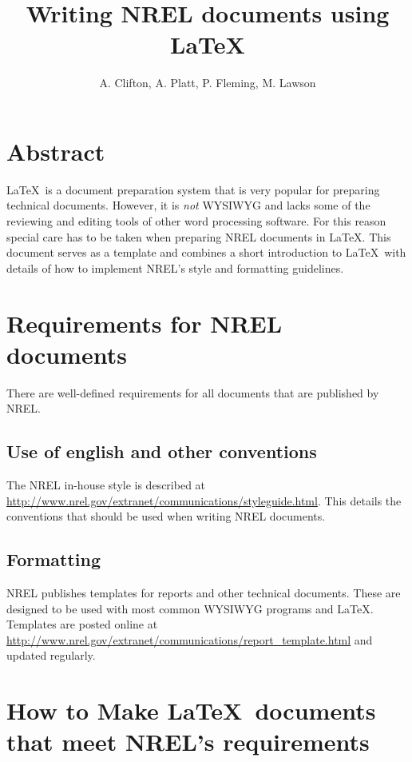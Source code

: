 \documentclass[12pt,letterpaper]{report}
\title{Writing NREL documents using \LaTeX}
\author{A. Clifton, A. Platt, P. Fleming, M. Lawson}
\begin{document}
\maketitle
{}
\setcounter{page}{3}

\chapter*{Abstract}
\LaTeX\ is a document preparation system that is very popular for preparing technical documents. However, it is \emph{not} WYSIWYG and lacks some of the reviewing and editing tools of other word processing software. For this reason special care has to be taken when preparing NREL documents in \LaTeX. This document serves as a template and combines a short introduction to \LaTeX\ with details of how to implement NREL's style and formatting guidelines.

\clearpage
\renewcommand{\contentsname}{Table of Contents}
\tableofcontents
\clearpage
\listoffigures
\listoftables
\clearpage
{}


\chapter{Requirements for NREL documents}

There are well-defined requirements for all documents that are published by NREL. 

\section{Use of english and other conventions}
The NREL in-house style is described at \url{http://www.nrel.gov/extranet/communications/styleguide.html}. This details the conventions that should be used when writing NREL documents.

\section{Formatting}
NREL publishes templates for reports and other technical documents. These are designed to be used with most common WYSIWYG programs and \LaTeX{}. Templates are posted online at \url{http://www.nrel.gov/extranet/communications/report_template.html} and updated regularly. 

\chapter{How to Make \LaTeX\ documents that meet NREL's requirements}
\end{document}
